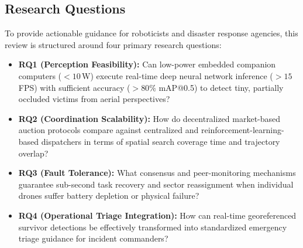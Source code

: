 \documentclass[journal]{IEEEtran}
\begin{document}
\begin{table}[!t]
\caption{Comparison of This Review With Existing Surveys in the Literature}
\label{tab:existing_reviews}
\centering
\small
{}
\end{table}

\subsection{Research Questions}
To provide actionable guidance for roboticists and disaster response agencies, this review is structured around four primary research questions:
\begin{itemize}
    \item \textbf{RQ1 (Perception Feasibility):} Can low-power embedded companion computers ($<10$\,W) execute real-time deep neural network inference ($>15$\,FPS) with sufficient accuracy ($>80\%$ mAP@0.5) to detect tiny, partially occluded victims from aerial perspectives?
    \item \textbf{RQ2 (Coordination Scalability):} How do decentralized market-based auction protocols compare against centralized and reinforcement-learning-based dispatchers in terms of spatial search coverage time and trajectory overlap?
    \item \textbf{RQ3 (Fault Tolerance):} What consensus and peer-monitoring mechanisms guarantee sub-second task recovery and sector reassignment when individual drones suffer battery depletion or physical failure?
    \item \textbf{RQ4 (Operational Triage Integration):} How can real-time georeferenced survivor detections be effectively transformed into standardized emergency triage guidance for incident commanders?
\end{itemize}
\end{document}
